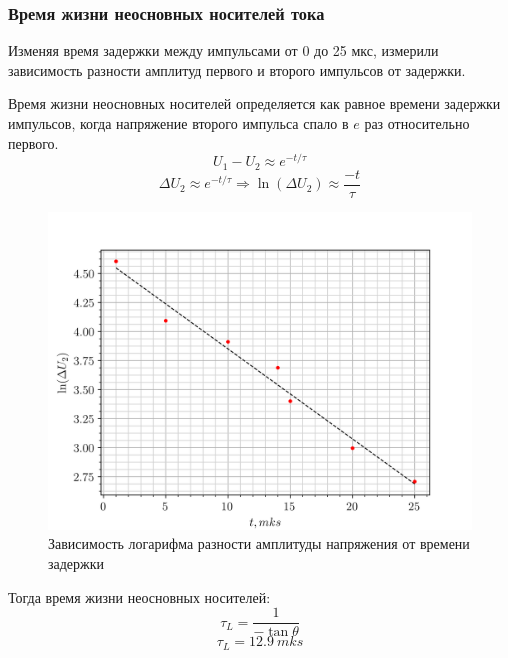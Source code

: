 \subsubsection{Время жизни неосновных носителей тока}
Изменяя время задержки между импульсами от 0 до 25 мкс, измерили зависимость разности амплитуд первого и второго
импульсов от задержки.

Время жизни неосновных носителей определяется как равное времени задержки импульсов, когда напряжение второго импульса
спало в $e$ раз относительно первого. 
$$ U_1 - U_2 \approx e^{-t/\tau}$$ 
$$\Delta U_2 \approx e^{-t/\tau} \Rightarrow \ln(\Delta U_2) \approx \frac{-t}{\tau}$$   
\begin{figure}[H]
	\centering
	\includegraphics[width=.6\linewidth]{graphs/task2.png}
	\caption{Зависимость логарифма разности амплитуды напряжения от времени задержки}
	\label{fig:exp.2}
\end{figure}
Тогда время жизни неосновных носителей:
$$\tau_L = \frac{1}{-\tan \theta} $$
$$ \tau_L = 12.9~mks $$


